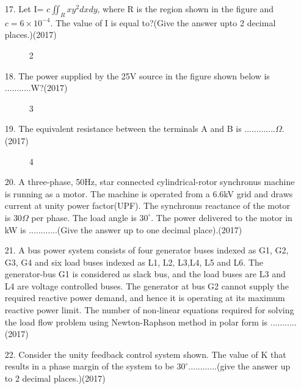 \documentclass[journal]{IEEEtran}
\begin{document}
\begin{enumerate}
    \item[17.] Let I= $c\iint_R xy^2 dxdy$, where R is the region shown in the figure and $c = 6\times 10^{-4}$. The value of I is equal to?(Give the answer upto 2 decimal places.)\hfill (2017)
    \begin{figure}[!ht]
        \centering
        \caption{2}
    \end{figure}
    \newpage
    \item[18.] The power supplied by the 25V source in the figure shown below is ...........W?\hfill (2017)
    \begin{figure}[!ht]
        \centering
        \caption{3}
    \end{figure}
    \item[19.] The equivalent resistance between the terminals A and B is .............$\Omega$.\hfill (2017)
    \begin{figure}[!ht]
        \centering
        \caption{4}
    \end{figure}
    \item[20.] A three-phase, 50Hz, star connected cylindrical-rotor synchronus machine is running as a motor. The machine is operated from a 6.6kV grid and draws current at unity power factor(UPF). The synchronus reactance of the motor is $30\Omega$ per phase. The load angle is $30^{\circ}$. The power delivered to the motor in kW is ............(Give the answer up to one decimal place).\hfill (2017)
    \item[21.] A bus power system consists of four generator buses indexed as G1, G2, G3, G4 and six load buses indexed as L1, L2, L3,L4, L5 and L6. The generator-bus G1 is considered as slack bus, and the load buses are L3 and L4 are voltage controlled buses. The generator at bus G2 cannot supply the required reactive power demand, and hence it is operating at its maximum reactive power limit. The number of non-linear equations required for solving the load flow problem using Newton-Raphson method in polar form is ...........\hfill (2017)
    \item[22.] Consider the unity feedback control system shown. The value of K that results in a phase margin of the system to be $30^{\circ}$............(give the answer up to 2 decimal places.)\hfill (2017)
    \begin{figure}[!ht]

\end{figure}
\end{enumerate}
\end{document}
